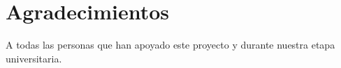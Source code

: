 
\chapter*{Agradecimientos}

A todas las personas que han apoyado este proyecto y durante nuestra etapa universitaria. 











